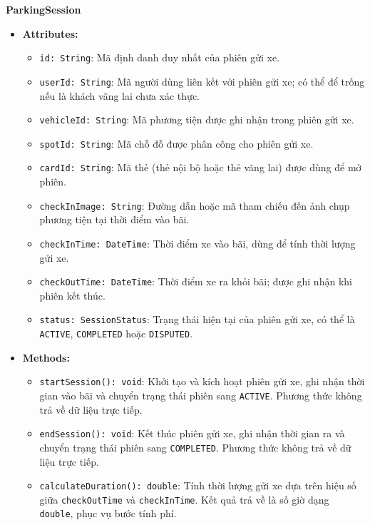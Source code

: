 \noindent\textbf{ParkingSession}
\begin{itemize}
	\item \textbf{Attributes:}
	\begin{itemize}
		\item \texttt{id: String}: Mã định danh duy nhất của phiên gửi xe.
		\item \texttt{userId: String}: Mã người dùng liên kết với phiên gửi xe; có thể để trống nếu là khách vãng lai chưa xác thực.
		\item \texttt{vehicleId: String}: Mã phương tiện được ghi nhận trong phiên gửi xe.
		\item \texttt{spotId: String}: Mã chỗ đỗ được phân công cho phiên gửi xe.
		\item \texttt{cardId: String}: Mã thẻ (thẻ nội bộ hoặc thẻ vãng lai) được dùng để mở phiên.
		\item \texttt{checkInImage: String}: Đường dẫn hoặc mã tham chiếu đến ảnh chụp phương tiện tại thời điểm vào bãi.
		\item \texttt{checkInTime: DateTime}: Thời điểm xe vào bãi, dùng để tính thời lượng gửi xe.
		\item \texttt{checkOutTime: DateTime}: Thời điểm xe ra khỏi bãi; được ghi nhận khi phiên kết thúc.
		\item \texttt{status: SessionStatus}: Trạng thái hiện tại của phiên gửi xe, có thể là \texttt{ACTIVE}, \texttt{COMPLETED} hoặc \texttt{DISPUTED}.
	\end{itemize}
	\item \textbf{Methods:}
	\begin{itemize}
		\item \texttt{startSession(): void}: Khởi tạo và kích hoạt phiên gửi xe, ghi nhận thời gian vào bãi và chuyển trạng thái phiên sang \texttt{ACTIVE}. Phương thức không trả về dữ liệu trực tiếp.
		\item \texttt{endSession(): void}: Kết thúc phiên gửi xe, ghi nhận thời gian ra và chuyển trạng thái phiên sang \texttt{COMPLETED}. Phương thức không trả về dữ liệu trực tiếp.
		\item \texttt{calculateDuration(): double}: Tính thời lượng gửi xe dựa trên hiệu số giữa \texttt{checkOutTime} và \texttt{checkInTime}. Kết quả trả về là số giờ dạng \texttt{double}, phục vụ bước tính phí.
	\end{itemize}
\end{itemize}

